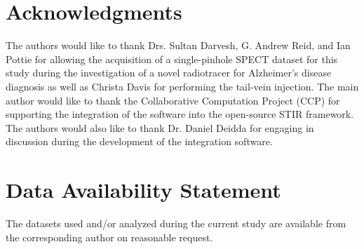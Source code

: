 \documentclass[utf8]{FrontiersinHarvard} %
\begin{document}

\section*{Acknowledgments}
The authors would like to thank Drs. Sultan Darvesh, G. Andrew Reid, and Ian Pottie for allowing the acquisition of a single-pinhole SPECT dataset for this study during the investigation of a novel radiotracer for Alzheimer's disease diagnosis as well as Christa Davis for performing the tail-vein injection. The main author would like to thank the Collaborative Computation Project (CCP) for supporting the integration of the software into the open-source STIR framework. The authors would also like to thank Dr. Daniel Deidda for engaging in discussion during the development of the integration software.



\section*{Data Availability Statement}
The datasets used and/or analyzed during the current study are available from the corresponding author on reasonable request.




\end{document}
